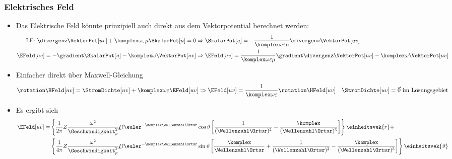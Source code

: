 \begin{frame}
  \frametitle{Elektrisches Feld}
  \begin{itemize}[<+->]
  \item Das Elektrische Feld könnte prinzipiell auch direkt aus dem Vektorpotential berechnet werden:
    \begin{align*}
      \text{LE: } \divergenz\VektorPot[uv] + \komplex \omega \varepsilon\mu \SkalarPot[u]  = 0 &\Rightarrow \SkalarPot[u] = -\frac{1}{\komplex \omega \varepsilon\mu} \divergenz\VektorPot[uv]\\
      \EFeld[uv] = -\gradient \SkalarPot[u] - \komplex \omega \VektorPot[uv] &\Rightarrow \EFeld[uv]  = \frac{1}{\komplex \omega \varepsilon\mu} \gradient \divergenz\VektorPot[uv]- \komplex \omega \VektorPot[uv]    
    \end{align*}
  \item Einfacher direkt über Maxwell-Gleichung
    \begin{equation*}
      \rotation \HFeld[uv] = \StromDichte[uv] + \komplex\omega\varepsilon\EFeld[uv] \Rightarrow \EFeld[uv] = \frac{1}{\komplex\omega\varepsilon} \rotation \HFeld[uv] \quad \StromDichte[uv] = \vec{0} \text{ im Lösungsgebiet} 
    \end{equation*}
  \item Es ergibt sich
    \begin{align*}
      \EFeld[uv] = &\left\{\frac{1}{2\pi} Z \frac{\omega^2}{\Geschwindigkeit_p^2}\underline{I} \ell  \euler^{-\komplex\Wellenzahl\Ortsr} \cos\vartheta\left[\frac{1}{(\Wellenzahl\Ortsr)^2} - \frac{\komplex}{(\Wellenzahl\Ortsr)^3}\right]\right\} \einheitsvek{r} + \\
      &\left\{ \frac{1}{4\pi} Z \frac{\omega^2}{\Geschwindigkeit_p^2}\underline{I} \ell  \euler^{-\komplex\Wellenzahl\Ortsr} \sin\vartheta\left[\frac{\komplex}{\Wellenzahl\Ortsr}  + \frac{1}{(\Wellenzahl\Ortsr)^2} - \frac{\komplex}{(\Wellenzahl\Ortsr)^3} \right] \right\} \einheitsvek{\vartheta}
      \end{align*}
  \end{itemize}
\end{frame}

